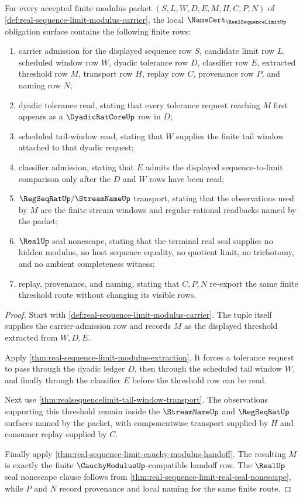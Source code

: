 \begin{theorem}\label{thm:real-sequence-limit-modulus-namecert-obligations}
For every accepted finite modulus packet $(S,L,W,D,E,M,H,C,P,N)$ of \autoref{def:real-sequence-limit-modulus-carrier}, the local $\NameCert_{\RealSequenceLimitUp}$ obligation surface contains the following finite rows:
\begin{enumerate}
\item carrier admission for the displayed sequence row $S$, candidate limit row $L$, scheduled window row $W$, dyadic tolerance row $D$, classifier row $E$, extracted threshold row $M$, transport row $H$, replay row $C$, provenance row $P$, and naming row $N$;
\item dyadic tolerance read, stating that every tolerance request reaching $M$ first appears as a $\DyadicRatCoreUp$ row in $D$;
\item scheduled tail-window read, stating that $W$ supplies the finite tail window attached to that dyadic request;
\item classifier admission, stating that $E$ admits the displayed sequence-to-limit comparison only after the $D$ and $W$ rows have been read;
\item $\RegSeqRatUp/\StreamNameUp$ transport, stating that the observations used by $M$ are the finite stream windows and regular-rational readbacks named by the packet;
\item $\RealUp$ seal nonescape, stating that the terminal real seal supplies no hidden modulus, no host sequence equality, no quotient limit, no trichotomy, and no ambient completeness witness;
\item replay, provenance, and naming, stating that $C,P,N$ re-export the same finite threshold route without changing its visible rows.
\end{enumerate}
\end{theorem}
\begin{proof}
Start with \autoref{def:real-sequence-limit-modulus-carrier}. The tuple itself supplies the carrier-admission row and records $M$ as the displayed threshold extracted from $W,D,E$.

Apply \autoref{thm:real-sequence-limit-modulus-extraction}. It forces a tolerance request to pass through the dyadic ledger $D$, then through the scheduled tail window $W$, and finally through the classifier $E$ before the threshold row can be read.

Next use \autoref{thm:realsequencelimit-tail-window-transport}. The observations supporting this threshold remain inside the $\StreamNameUp$ and $\RegSeqRatUp$ surfaces named by the packet, with componentwise transport supplied by $H$ and consumer replay supplied by $C$.

Finally apply \autoref{thm:real-sequence-limit-cauchy-modulus-handoff}. The resulting $M$ is exactly the finite $\CauchyModulusUp$-compatible handoff row. The $\RealUp$ seal nonescape clause follows from \autoref{thm:real-sequence-limit-real-seal-nonescape}, while $P$ and $N$ record provenance and local naming for the same finite route.
\end{proof}

